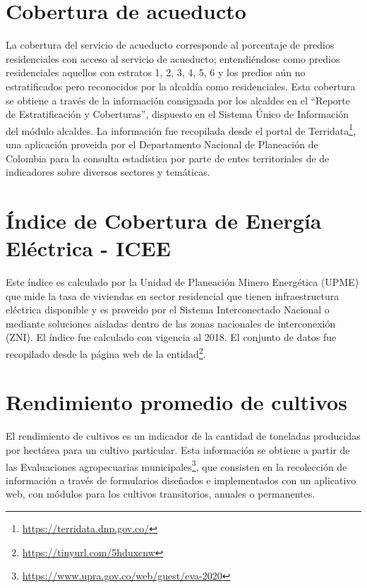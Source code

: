 \label{sec:fuentes}

\section{Cobertura de acueducto}
La cobertura del servicio de acueducto corresponde al porcentaje de predios residenciales con acceso al servicio de acueducto; entendiéndose como predios 
residenciales aquellos con estratos 1, 2, 3, 4, 5, 6 y los predios aún no estratificados pero reconocidos por la alcaldía como residenciales. Esta cobertura se 
obtiene a través de la información consignada por los alcaldes en el ``Reporte de Estratificación y Coberturas'', dispuesto en el Sistema Único de Información 
del módulo alcaldes.  La información fue recopilada desde el portal de Terridata\footnote{\url{https://terridata.dnp.gov.co/}}, una 
aplicación proveida por el Departamento Nacional de Planeación de Colombia para la consulta estadística por parte de entes territoriales de de indicadores sobre 
diversos sectores y temáticas.

\section{Índice de Cobertura de Energía Eléctrica - ICEE}

Este índice es calculado por la Unidad de Planeación Minero Energética (UPME) que mide la tasa de viviendas en sector residencial que tienen infraestructura 
eléctrica disponible y es proveido por el Sistema Interconectado Nacional o mediante soluciones aisladas dentro de las zonas nacionales de interconexión (ZNI). 
 El índice fue calculado con vigencia al 2018.  El conjunto de datos fue recopilado desde la página web de la 
entidad\footnote{\url{https://tinyurl.com/5hduxcnw}}.

\section{Rendimiento promedio de cultivos}

El rendimiento de cultivos es un indicador de la cantidad de toneladas producidas por hectárea para un cultivo particular. Esta información se obtiene a partir 
de las Evaluaciones agropecuarias municipales\footnote{\url{https://www.upra.gov.co/web/guest/eva-2020}}, que consisten en la recolección de información a 
través de formularios diseñados e implementados con un aplicativo web, con módulos para los cultivos transitorios, anuales o permanentes. 

